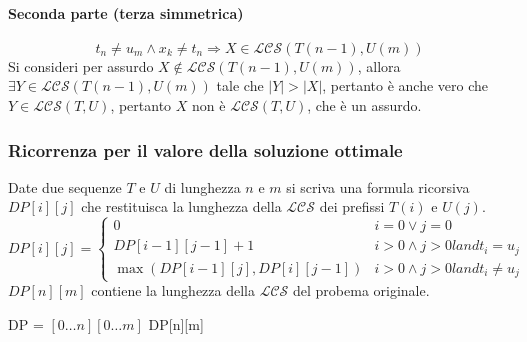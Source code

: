 \paragraph{Seconda parte (terza simmetrica)}
$$t_n\neq u_m\land x_k\neq t_n \Rightarrow X\in \mathcal{LCS}(T(n-1), U(m))$$
Si consideri per assurdo $X\not\in \mathcal{LCS}(T(n-1), U(m))$, allora $\exists Y\in\mathcal{LCS}(T(n-1), U(m))$ tale che $|Y|>|X|$, pertanto \`e anche
vero che $Y\in \mathcal{LCS}(T, U)$, pertanto $X$ non \`e $\mathcal{LCS}(T, U)$, che \`e un assurdo. 
\subsubsection{Ricorrenza per il valore della soluzione ottimale}
Date due sequenze $T$ e $U$ di lunghezza $n$ e $m$ si scriva una formula ricorsiva $DP[i][j]$ che restituisca la lunghezza della $\mathcal{LCS}$ dei 
prefissi $T(i)$ e $U(j)$.
$$
DP[i][j] = 
\begin{cases}
0 & i = 0\lor j = 0\\
DP[i-1][j-1]+1 & i > 0 \land j > 0 land t_i = u_j\\
\max(DP[i - 1][j], DP[i][j - 1]) & i > 0 \land j > 0 land t_i \neq u_j
\end{cases}
$$ 
$DP[n][m]$ contiene la lunghezza della $\mathcal{LCS}$ del probema originale. \\
\begin{algorithm}[H]
\DontPrintSemicolon
{}





\SetKwFunction{}{}
\SetKwFunction{}{}

\caption{\protect\Int \protect{}}
\Int[][] DP = \New \Int$[0\dots n][0\dots m]$\;
\Return DP[n][m]\;
\end{algorithm}
